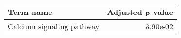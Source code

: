 \begin{tabular}{lr}
\toprule
                Term name &  Adjusted p-value \\
\midrule
Calcium signaling pathway &          3.90e-02 \\
\bottomrule
\end{tabular}
